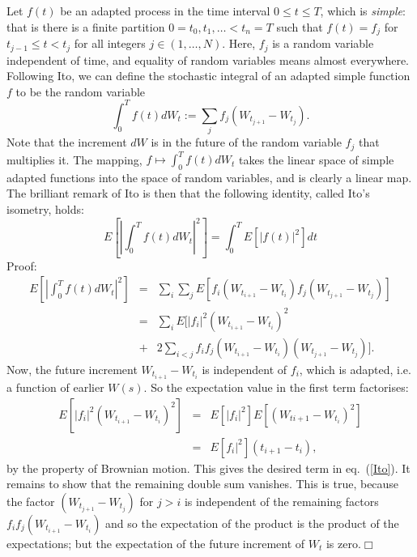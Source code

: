 Let $f(t)$ be an adapted process in the time interval $0\leq t\leq T$,
which is {\em simple}: that is there is a finite partition $0=t_0,t_1,
\ldots<t_n=T$ such that $f(t)=f_j$ for $t_{j-1}\leq t<t_j$ for all
integers $j\in(1,\ldots,N)$. Here, $f_j$ is a random variable independent
of time, and equality of random variables means almost everywhere.
Following Ito, we can define the stochastic integral of an adapted simple
function $f$ to be the random variable
\begin{equation}
\int_0^Tf(t)dW_t:=\sum_jf_j(W_{t_{j+1}}-W_{t_j}).
\end{equation}
Note that the increment $dW$ is in the future of the random variable
$f_j$ that multiplies it. The mapping, $f\mapsto\int_0^Tf(t)dW_t$ takes
the linear space of simple adapted functions into the space
of random variables, and is clearly a linear map. The brilliant
remark of Ito is then that the following identity, called Ito's isometry,
holds:
\begin{equation}
E[|\int_0^Tf(t)dW_t|^2]=\int_0^TE[|f(t)|^2]dt
\label{Ito}
\end{equation}
Proof:
\begin{eqnarray*}
E[|\int_0^Tf(t)dW_t|^2]&=&\sum_i\sum_jE[f_i(W_{t_{i+1}}-W_{t_i})f_j(W_{t_{
j+1}}-W_{t_j})]\\
&=&\sum_iE[|f_i|^2(W_{t_{i+1}}-W_{t_i})^2\\
&+&2\sum_{i<j}f_if_j(W_{t_{i+1}}-
W_{t_i})(W_{t_{j+1}}-W_{t_j})].
\end{eqnarray*}
Now, the future increment $W_{t_{i+1}}-W_{t_i}$ is independent of $f_i$,
which is adapted, i.e. a function of earlier $W(s)$. So the expectation
value in the first term factorises:
\begin{eqnarray*}
E[|f_i|^2(W_{t_{i+1}}-W_{t_i})^2]&=&E[|f_i|^2]E[(W_{t{i+1}}-W_{t_i})^2]\\
&=&E[f_i|^2](t_{i+1}-t_i),
\end{eqnarray*}
by the property of Brownian motion. This gives the desired term in
eq.~(\ref{Ito}). It remains to show that the remaining double sum vanishes.
This is true, because the factor $(W_{t_{j+1}}-W_{t_j})$ for $j>i$ is
independent of the remaining factors $f_if_j(W_{t_{i+1}}-W_{t_i})$ and so
the expectation of the product is the product of the expectations;
but the expectation of the future increment of $W_t$
is zero.\hspace{\fill}$\Box$

